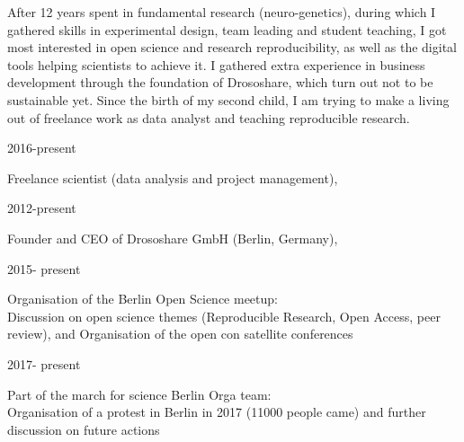 %
After 12 years spent in fundamental research (neuro-genetics), during which I gathered skills in experimental design, team leading and student teaching, I got most interested in open science and research reproducibility, as well as the digital tools helping scientists to achieve it.
I gathered extra experience in business development through the foundation of Drososhare, which turn out not to be sustainable yet. Since the birth of my second child, I am trying to make a living out of freelance work as data analyst and teaching reproducible research.


%
\parbox{0.15\textwidth}{2016-present}\hfill
\parbox[t]{0.83\textwidth}{Freelance scientist (data analysis and project management),\\
        }     
%
\parbox{0.15\textwidth}{2012-present}\hfill
\parbox[t]{0.83\textwidth}{Founder and CEO 
       of Drososhare GmbH (Berlin, Germany),\\
        }


  
 \parbox{0.15\textwidth}{2015- present}\hfill
\parbox[t]{0.83\textwidth}{Organisation of the Berlin Open Science meetup:\\
Discussion on open science themes (Reproducible Research, Open Access, peer review),
and Organisation of the open con satellite conferences}     
%
 \parbox{0.15\textwidth}{2017- present}\hfill
\parbox[t]{0.83\textwidth}{Part of the march for science Berlin Orga team:\\
Organisation of a protest in Berlin in 2017 (11000 people came) and further discussion on future actions}   
              
